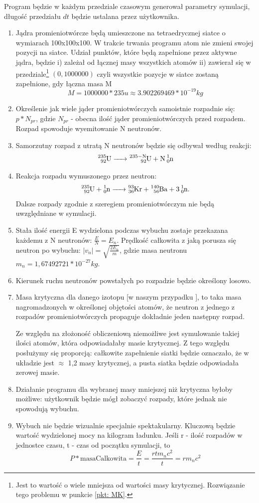 \documentclass[12pt, a4paper, oneside]{article}
\begin{document}
Program będzie w każdym przedziale czasowym generował parametry symulacji, długość przedziału $dt$ będzie ustalana przez użytkownika.
\begin{enumerate}
    \item Jądra promieniotwórcze  będą umieszczone na tetraedrycznej siatce o wymiarach 100x100x100. W trakcie trwania programu atom nie zmieni swojej pozycji na siatce. Udział punktów, które będą zapełnione przez aktywne jądra, będzie i) zależał od łącznej masy wszystkich atomów ii) zawierał się w przedziale\footnote{Jest to wartość o wiele mniejsza od wartości masy krytycznej. Rozwiązanie tego problemu w punkcie \ref{pkt: MK}.} $(0,1000000)$ czyli wszystkie pozycje w siatce zostaną zapełnione, gdy łączna masa M $$M=1000000*235 u \approx 3.902269469 * 10^{-19} kg$$
    \item Określenie jak wiele jąder promieniotwórczych samoistnie rozpadnie się: $p * N_{pr}$, gdzie $N_{pr}$ - obecna ilość jąder promieniotwórczych przed rozpadem. Rozpad spowoduje wyemitowanie N neutronów.
    \item Samorzutny rozpad z utratą N neutronów będzie się odbywał według reakcji: $$\ce{^{235}_{92}U -> ^{235-N}_92U + N ^1_0n}$$
    \item Reakcja rozpadu wymuszonego przez neutron: $$\ce{^{235}_{92}U + ^{1}_{0}n  -> ^{93}_{36}Kr + ^{140}_{56}Ba  + 3^{1}_{0}n }. $$ Dalsze rozpady zgodnie z szeregiem promieniotwórczym nie będą uwzględniane w symulacji.
    \item Stała ilość energii E wydzielona podczas wybuchu zostaje przekazana każdemu z N neutronów: $\frac{E}{N}=E_n$. Prędkość całkowita z jaką porusza się neutron po wybuchu: $|v_n|=\sqrt{\frac{2E_n}{m}}$, gdzie masa neutronu $m_n= 1,67492721*10^{-27} kg$.
    \item Kierunek ruchu neutronów powstałych po rozpadzie będzie określony losowo.
    \item \label{pkt: MK} Masa krytyczna dla danego izotopu [w naszym przypadku ], to taka masa nagromadzonych w określonej objętości atomów, że neutron z jednego z rozpadów promieniotwórczych propaguje dokładnie jeden następny rozpad.

    Ze względu na złożoność obliczeniową niemożliwe jest symulowanie takiej ilości atomów, która odpowiadałaby masie krytycznej. Z tego względu posłużymy się proporcją: całkowite zapełnienie siatki będzie oznaczało, że w układzie jest $\approx$ 1,2 masy krytycznej, a pusta siatka będzie odpowiadała zerowej masie.
    \item Działanie programu dla wybranej masy mniejszej niż krytyczna byłoby możliwe: użytkownik będzie mógł zobaczyć rozpady, które jednak nie spowodują wybuchu.
    \item Wybuch nie będzie wizualnie specjalnie spektakularny. Kluczową będzie wartość wydzielonej mocy na kilogram ładunku. Jeśli r - ilość rozpadów w jednostce czasu, t - czas od początku symulacji, to
    \begin{equation}
        P*\text{masaCalkowita}=\frac{E}{t}=\frac{r t m_n c^2}{t}=r m_n c^2
    \end{equation}
\end{enumerate}
  
\end{document}
